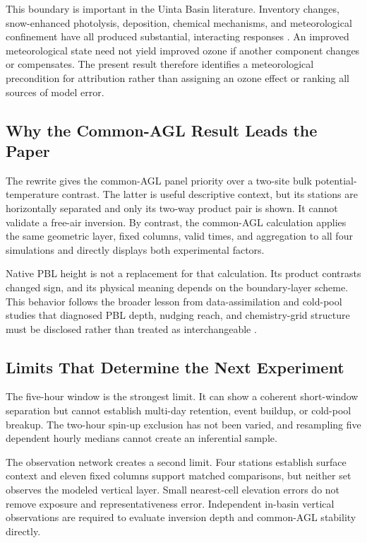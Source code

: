 \documentclass[air,article,submit,moreauthors]{Definitions/mdpi}
\begin{document}
This boundary is important in the Uinta Basin literature.
Inventory changes, snow-enhanced photolysis, deposition, chemical mechanisms, and meteorological confinement have all produced substantial, interacting responses \citep{Ahmadov2015-zm,Neemann2015-ws,Matichuk2017-bq}.
An improved meteorological state need not yield improved ozone if another component changes or compensates.
The present result therefore identifies a meteorological precondition for attribution rather than assigning an ozone effect or ranking all sources of model error.

\subsection{Why the Common-AGL Result Leads the Paper}

The rewrite gives the common-AGL panel priority over a two-site bulk potential-temperature contrast.
The latter is useful descriptive context, but its stations are horizontally separated and only its two-way product pair is shown.
It cannot validate a free-air inversion.
By contrast, the common-AGL calculation applies the same geometric layer, fixed columns, valid times, and aggregation to all four simulations and directly displays both experimental factors.

Native PBL height is not a replacement for that calculation.
Its product contrasts changed sign, and its physical meaning depends on the boundary-layer scheme.
This behavior follows the broader lesson from data-assimilation and cold-pool studies that diagnosed PBL depth, nudging reach, and chemistry-grid structure must be disclosed rather than treated as interchangeable \citep{Tran2018-cx,Neemann2015-ws}.

\subsection{Limits That Determine the Next Experiment}

The five-hour window is the strongest limit.
It can show a coherent short-window separation but cannot establish multi-day retention, event buildup, or cold-pool breakup.
The two-hour spin-up exclusion has not been varied, and resampling five dependent hourly medians cannot create an inferential sample.

The observation network creates a second limit.
Four stations establish surface context and eleven fixed columns support matched comparisons, but neither set observes the modeled vertical layer.
Small nearest-cell elevation errors do not remove exposure and representativeness error.
Independent in-basin vertical observations are required to evaluate inversion depth and common-AGL stability directly.
\end{document}
